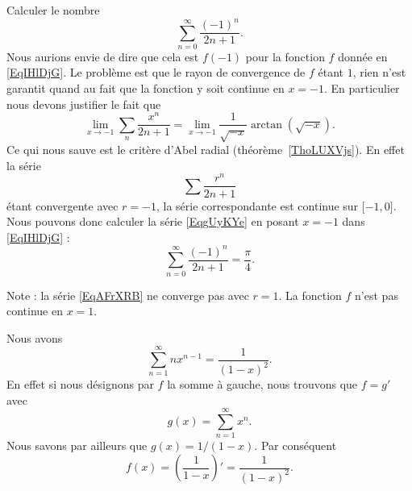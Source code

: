 \begin{example}
    Calculer le nombre
    \begin{equation}        \label{EqgUyKYe}
        \sum_{n=0}^{\infty}\frac{ (-1)^n }{ 2n+1 }.
    \end{equation}
    Nous aurions envie de dire que cela est \( f(-1)\) pour la fonction \( f\) donnée en \eqref{EqIHlDjG}. Le problème est que le rayon de convergence de \( f\) étant \( 1\), rien n'est garantit quand au fait que la fonction y soit continue en \( x=-1\). En particulier nous devons justifier le fait que
    \begin{equation}
        \lim_{x\to -1} \sum_n\frac{ x^n }{ 2n+1 }=\lim_{x\to -1} \frac{1}{ \sqrt{-x} }\arctan(\sqrt{-x}).
    \end{equation}
    Ce qui nous sauve est le critère d'Abel radial (théorème~\ref{ThoLUXVjs}). En effet la série
    \begin{equation}        \label{EqAFrXRB}
        \sum\frac{ r^n }{ 2n+1 }
    \end{equation}
    étant convergente avec \( r=-1\), la série correspondante est continue sur \( \mathopen[ -1 , 0 \mathclose]\). Nous pouvons donc calculer la série \eqref{EqgUyKYe} en posant \( x=-1\) dans \eqref{EqIHlDjG} :
    \begin{equation}
        \sum_{n=0}^{\infty}\frac{ (-1)^n }{ 2n+1 }=\frac{ \pi }{ 4 }.
    \end{equation}

    Note : la série \eqref{EqAFrXRB} ne converge pas avec \( r=1\). La fonction \( f\) n'est pas continue en \( x=1\).
\end{example}

\begin{example}     \label{ExGxzLlP}
    Nous avons
    \begin{equation}
        \sum_{n=1}^{\infty}nx^{n-1}=\frac{1}{ (1-x)^2 }.
    \end{equation}
    En effet si nous désignons par \( f\) la somme à gauche, nous trouvons que \( f=g'\) avec
    \begin{equation}
        g(x)=\sum_{n=1}^{\infty}x^n.
    \end{equation}
    Nous savons par ailleurs que \( g(x)=1/(1-x)\). Par conséquent
    \begin{equation}
        f(x)=\left( \frac{1}{ 1-x } \right)'=\frac{1}{ (1-x)^2 }.
    \end{equation}
\end{example}


